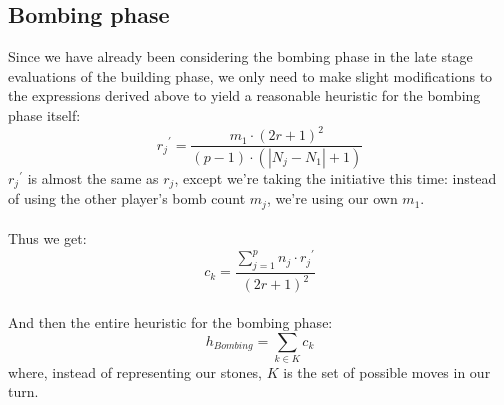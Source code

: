 \documentclass[a4paper,12pt]{article}
\begin{document}
\subsection{Bombing phase}
Since we have already been considering the bombing phase in the late stage evaluations of the building phase, we only need to make slight modifications to the expressions derived above to yield a reasonable heuristic for the bombing phase itself: \\
\[{r_j}^{\prime} = \frac{m_1 \cdot (2r+1)^2}{(p-1) \cdot (|N_j - N_1| + 1)} \]
${r_j}^{\prime}$ is almost the same as $r_j$, except we're taking the initiative this time: instead of using the other player's bomb count $m_j$, we're using our own $m_1$. \\
\\
Thus we get: \\
\[c_k = \frac{\sum\limits_{j=1}^p n_j \cdot {r_j}^{\prime}}{(2r+1)^2}\]
\\
And then the entire heuristic for the bombing phase: \\
\[ h_{Bombing} = \sum\limits_{k \in K} c_k \]
where, instead of representing our stones, $K$ is the set of possible moves in our turn.
\end{document}

